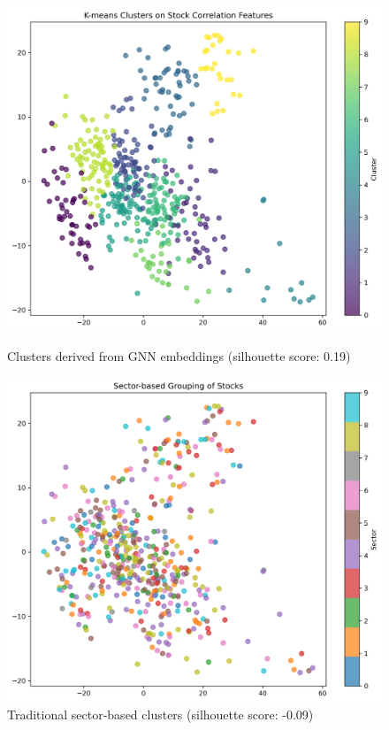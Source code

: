 \documentclass[12pt]{article}
\begin{document}
\begin{figure}[h]
    \centering
    \begin{minipage}{0.48\textwidth}
        \centering
        \includegraphics[width=\textwidth]{../results/cluster_analysis/feature_clusters.png}
        \caption{Clusters derived from GNN embeddings (silhouette score: 0.19)}
        \label{fig:feature_clusters}
    \end{minipage}\hfill
    \begin{minipage}{0.48\textwidth}
        \centering
        \includegraphics[width=\textwidth]{../results/cluster_analysis/sector_clusters.png}
        \caption{Traditional sector-based clusters (silhouette score: -0.09)}
        \label{fig:sector_clusters}
    \end{minipage}
\end{figure}
\end{document}
